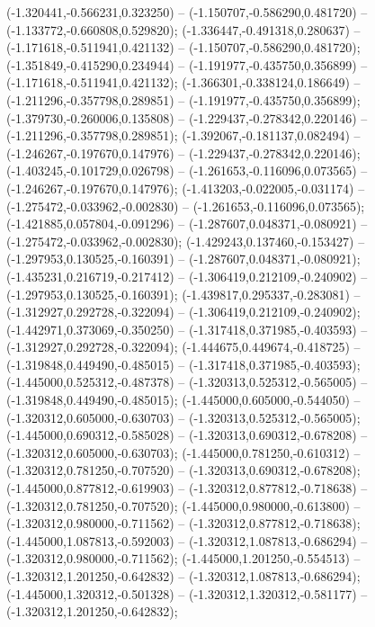  (-1.320441,-0.566231,0.323250) -- (-1.150707,-0.586290,0.481720) -- (-1.133772,-0.660808,0.529820);
 (-1.336447,-0.491318,0.280637) -- (-1.171618,-0.511941,0.421132) -- (-1.150707,-0.586290,0.481720);
 (-1.351849,-0.415290,0.234944) -- (-1.191977,-0.435750,0.356899) -- (-1.171618,-0.511941,0.421132);
 (-1.366301,-0.338124,0.186649) -- (-1.211296,-0.357798,0.289851) -- (-1.191977,-0.435750,0.356899);
 (-1.379730,-0.260006,0.135808) -- (-1.229437,-0.278342,0.220146) -- (-1.211296,-0.357798,0.289851);
 (-1.392067,-0.181137,0.082494) -- (-1.246267,-0.197670,0.147976) -- (-1.229437,-0.278342,0.220146);
 (-1.403245,-0.101729,0.026798) -- (-1.261653,-0.116096,0.073565) -- (-1.246267,-0.197670,0.147976);
 (-1.413203,-0.022005,-0.031174) -- (-1.275472,-0.033962,-0.002830) -- (-1.261653,-0.116096,0.073565);
 (-1.421885,0.057804,-0.091296) -- (-1.287607,0.048371,-0.080921) -- (-1.275472,-0.033962,-0.002830);
 (-1.429243,0.137460,-0.153427) -- (-1.297953,0.130525,-0.160391) -- (-1.287607,0.048371,-0.080921);
 (-1.435231,0.216719,-0.217412) -- (-1.306419,0.212109,-0.240902) -- (-1.297953,0.130525,-0.160391);
 (-1.439817,0.295337,-0.283081) -- (-1.312927,0.292728,-0.322094) -- (-1.306419,0.212109,-0.240902);
 (-1.442971,0.373069,-0.350250) -- (-1.317418,0.371985,-0.403593) -- (-1.312927,0.292728,-0.322094);
 (-1.444675,0.449674,-0.418725) -- (-1.319848,0.449490,-0.485015) -- (-1.317418,0.371985,-0.403593);
 (-1.445000,0.525312,-0.487378) -- (-1.320313,0.525312,-0.565005) -- (-1.319848,0.449490,-0.485015);
 (-1.445000,0.605000,-0.544050) -- (-1.320312,0.605000,-0.630703) -- (-1.320313,0.525312,-0.565005);
 (-1.445000,0.690312,-0.585028) -- (-1.320313,0.690312,-0.678208) -- (-1.320312,0.605000,-0.630703);
 (-1.445000,0.781250,-0.610312) -- (-1.320312,0.781250,-0.707520) -- (-1.320313,0.690312,-0.678208);
 (-1.445000,0.877812,-0.619903) -- (-1.320312,0.877812,-0.718638) -- (-1.320312,0.781250,-0.707520);
 (-1.445000,0.980000,-0.613800) -- (-1.320312,0.980000,-0.711562) -- (-1.320312,0.877812,-0.718638);
 (-1.445000,1.087813,-0.592003) -- (-1.320312,1.087813,-0.686294) -- (-1.320312,0.980000,-0.711562);
 (-1.445000,1.201250,-0.554513) -- (-1.320312,1.201250,-0.642832) -- (-1.320312,1.087813,-0.686294);
 (-1.445000,1.320312,-0.501328) -- (-1.320312,1.320312,-0.581177) -- (-1.320312,1.201250,-0.642832);
